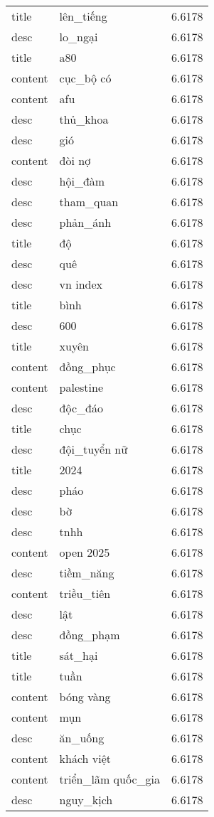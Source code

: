 \documentclass{article}
\begin{document}
\begin{tabular}{lll}
title & lên\_tiếng & 6.6178\\
desc & lo\_ngại & 6.6178\\
title & a80 & 6.6178\\
content & cục\_bộ có & 6.6178\\
content & afu & 6.6178\\
desc & thủ\_khoa & 6.6178\\
desc & gió & 6.6178\\
content & đòi nợ & 6.6178\\
desc & hội\_đàm & 6.6178\\
desc & tham\_quan & 6.6178\\
desc & phản\_ánh & 6.6178\\
title & độ & 6.6178\\
desc & quê & 6.6178\\
desc & vn index & 6.6178\\
title & bình & 6.6178\\
desc & 600 & 6.6178\\
title & xuyên & 6.6178\\
content & đồng\_phục & 6.6178\\
content & palestine & 6.6178\\
desc & độc\_đáo & 6.6178\\
title & chục & 6.6178\\
desc & đội\_tuyển nữ & 6.6178\\
title & 2024 & 6.6178\\
desc & pháo & 6.6178\\
desc & bờ & 6.6178\\
desc & tnhh & 6.6178\\
content & open 2025 & 6.6178\\
desc & tiềm\_năng & 6.6178\\
content & triều\_tiên & 6.6178\\
desc & lật & 6.6178\\
desc & đồng\_phạm & 6.6178\\
title & sát\_hại & 6.6178\\
title & tuần & 6.6178\\
content & bóng vàng & 6.6178\\
content & mụn & 6.6178\\
desc & ăn\_uống & 6.6178\\
content & khách việt & 6.6178\\
content & triển\_lãm quốc\_gia & 6.6178\\
desc & nguy\_kịch & 6.6178\\

\end{tabular}
\end{document}

